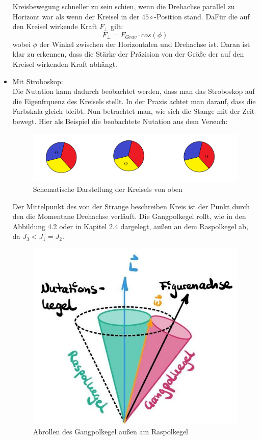 \begin{itemize}
        Kreisbewegung schneller zu sein schien, wenn die Drehachse parallel zu Horizont war als wenn der Kreisel in der $45\circ$-Position stand. DaFür die auf den 
        Kreisel wirkende Kraft $F_{\bot}$ gilt:
    \begin{equation*}
        F_{\bot} = F_{Grav} \cdot cos(\phi)
    \end{equation*}
    wobei $\phi$ der Winkel zwischen der Horizontalen und Drehachse ist.
    Daran ist klar zu erkennen, dass die Stärke der Präzision von der Größe der auf den Kreisel wirkenden Kraft abhängt.
    \item Mit Stroboskop:\\
        Die Nutation kann dadurch beobachtet werden, dass man das Stroboskop auf die Eigenfrquenz des Kreisels stellt. In der Praxis achtet man darauf, dass die Farbskala gleich bleibt. Nun betrachtet man, wie sich 
        die Stange mit der Zeit bewegt. Hier als Beispiel die beobachtete Nutation aus dem Versuch:\\
        \begin{figure}[h]
            \centering
            \includegraphics[width = 13cm]{Bilder/Leo/Nutationfarben.png}
            \caption{Schematische Darstellung der Kreisels von oben}
        \end{figure}
        Der Mittelpunkt des von der Strange beschreiben Kreis ist der Punkt durch den die Momentane Drehachse verläuft.
        Die Gangpolkegel rollt, wie in den Abbildung 4.2 oder in Kapitel 2.4 %
        dargelegt, außen an dem Raspolkegel ab, da $J_3 < J_1 = J_2$.
        \begin{figure}[h]
            \centering
            \includegraphics[scale = 0.3]{Bilder/6_1-Nutationsbewegung.jpg}
            \caption{Abrollen des Gangpolkegel außen am Raspolkegel}
        \end{figure}

\end{itemize}

